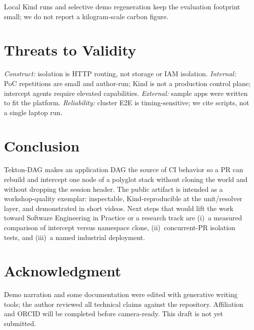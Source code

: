 \documentclass[10pt,conference]{IEEEtran}
\begin{document}
Local Kind runs and selective demo regeneration keep the evaluation footprint small; we do not report a kilogram-scale carbon figure.

\section{Threats to Validity}

\emph{Construct:} isolation is HTTP routing, not storage or IAM isolation. \emph{Internal:} PoC repetitions are small and author-run; Kind is not a production control plane; intercept agents require elevated capabilities. \emph{External:} sample apps were written to fit the platform. \emph{Reliability:} cluster E2E is timing-sensitive; we cite scripts, not a single laptop run.

\section{Conclusion}

Tekton-DAG makes an application DAG the source of CI behavior so a PR can rebuild and intercept one node of a polyglot stack without cloning the world and without dropping the session header. The public artifact is intended as a workshop-quality exemplar: inspectable, Kind-reproducible at the unit/resolver layer, and demonstrated in short videos. Next steps that would lift the work toward Software Engineering in Practice or a research track are (i)~a measured comparison of intercept versus namespace clone, (ii)~concurrent-PR isolation tests, and (iii)~a named industrial deployment.

\section*{Acknowledgment}

Demo narration and some documentation were edited with generative writing tools; the author reviewed all technical claims against the repository. Affiliation and ORCID will be completed before camera-ready. This draft is not yet submitted.
\end{document}
